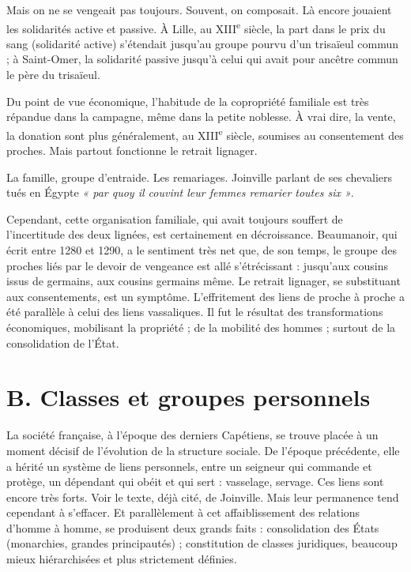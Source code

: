 \documentclass[french,twoside]{book} %
\begin{document}
Mais on ne se vengeait pas toujours. Souvent, on composait. Là encore jouaient les solidarités active et passive. À Lille, au XIII\textsuperscript{e} siècle, la part dans le prix du sang (solidarité active) s’étendait  
\label{p56} jusqu’au groupe pourvu d’un trisaïeul commun ; à Saint-Omer, la solidarité passive jusqu’à celui qui avait pour ancêtre commun le père du trisaïeul.\par
Du point de vue économique, l’habitude de la copropriété familiale est très répandue dans la campagne, même dans la petite noblesse. À vrai dire, la vente, la donation sont plus généralement, au XIII\textsuperscript{e} siècle, soumises au consentement des proches. Mais partout fonctionne le retrait lignager.\par
La famille, groupe d’entraide. Les remariages. Joinville parlant de ses chevaliers tués en Égypte \emph{« par quoy il couvint leur femmes remarier toutes six »}.\par
Cependant, cette organisation familiale, qui avait toujours souffert de l’incertitude des deux lignées, est certainement en décroissance. Beaumanoir, qui écrit entre 1280 et 1290, a le sentiment très net que, de son temps, le groupe des proches liés par le devoir de vengeance est allé s’étrécissant : jusqu’aux cousins issus de germains, aux cousins germains même. Le retrait lignager, se substituant aux consentements, est un symptôme. L’effritement des liens de proche à proche a été parallèle à celui des liens vassaliques. Il fut le résultat des transformations économiques, mobilisant la propriété ; de la mobilité des hommes ; surtout de la consolidation de l’État.
\section[B. Classes et groupes personnels]{B. Classes et groupes personnels}
\label{c07b}
\noindent La société française, à l’époque des derniers Capétiens, se trouve placée à un moment décisif de l’évolution de la structure sociale. De l’époque précédente, elle a hérité un système de liens personnels, entre un seigneur qui commande et protège, un dépendant qui obéit et qui sert : vasselage, servage. Ces liens sont encore très forts. Voir le texte, déjà cité, de Joinville. Mais leur permanence tend cependant à s’effacer. Et parallèlement à cet affaiblissement des relations d’homme à homme, se produisent deux grands faits : consolidation des États (monarchies, grandes principautés) ; constitution de classes juridiques, beaucoup mieux hiérarchisées et plus strictement définies.
\end{document}
